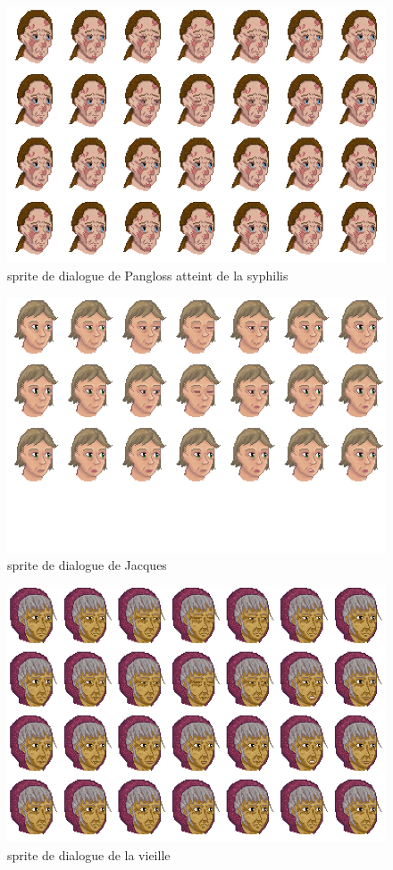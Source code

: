 \documentclass[11pt]{article}
\begin{document}
\begin{appendices}
\begin{figure}[H]
\includegraphics[scale=0.4]{panglossSyphilisFaceAnimation}
\centering
\caption{sprite de dialogue de Pangloss atteint de la syphilis}
\end{figure}

\begin{figure}[H]
\includegraphics[scale=0.4]{jacquesFaceAnimation}
\centering
\caption{sprite de dialogue de Jacques}
\end{figure}

\begin{figure}[H]
\includegraphics[scale=0.4]{vieilleFaceAnimation}
\centering
\caption{sprite de dialogue de la vieille}
\end{figure}


\end{appendices}
\end{document}
